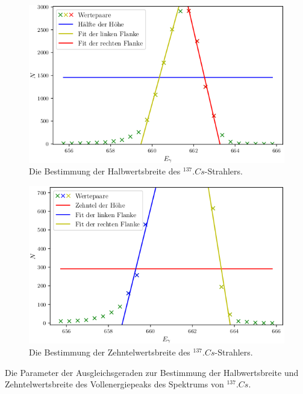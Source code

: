 \begin{figure}
	\centering
	\includegraphics[width=\linewidth-70pt,height=\textheight-70pt,keepaspectratio]{content/images/Cs137Halb.png}
	\caption{Die Bestimmung der Halbwertsbreite des $^{137}.{Cs}$-Strahlers.}
	\label{fig:2tel}
\end{figure}

\begin{figure}
	\centering
	\includegraphics[width=\linewidth-70pt,height=\textheight-70pt,keepaspectratio]{content/images/Cs137Zehntel.png}
	\caption{Die Bestimmung der Zehntelwertsbreite des $^{137}.{Cs}$-Strahlers.}
	\label{fig:10tel}
\end{figure}

\begin{table}
	\centering
	\caption{Die Parameter der Ausgleichsgeraden zur Bestimmung der Halbwertsbreite und Zehntelwertsbreite des Vollenergiepeaks des Spektrums von $^{137}.{Cs}$.}
	
	\label{tab:geradenBreite}
\end{table}

